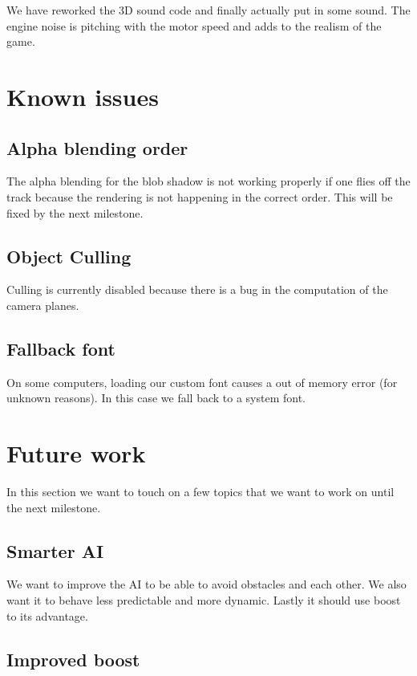 \documentclass[11pt]{article}
\begin{document}
We have reworked the 3D sound code and finally actually put in some sound. The engine noise is pitching with the motor speed and adds to the realism of the game. 

\section{Known issues}

\subsection{Alpha blending order}

The alpha blending for the blob shadow is not working properly if one flies off the track because the rendering is not happening in the correct order. This will be fixed by the next milestone.

\subsection{Object Culling}

Culling is currently disabled because there is a bug in the computation of the camera planes.

\subsection{Fallback font}

On some computers, loading our custom font causes a out of memory error (for unknown reasons). In this case we fall back to a system font.

\section{Future work}
\label{future-work}

In this section we want to touch on a few topics that we want to work on until the next milestone.

\subsection{Smarter AI}

We want to improve the AI to be able to avoid obstacles and each other. We also want it to behave less predictable and more dynamic. Lastly it should use boost to its advantage.

\subsection{Improved boost}
\end{document}
